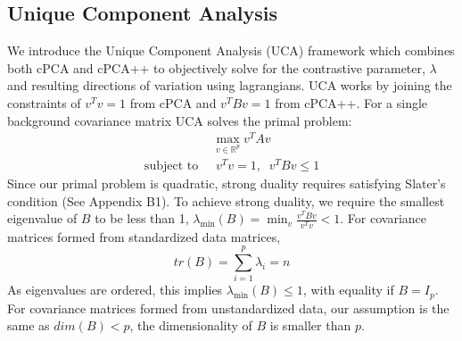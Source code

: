 \documentclass[12pt]{article}
\begin{document}
\subsection{Unique Component Analysis}
We introduce the Unique Component Analysis (UCA) framework which combines both cPCA and cPCA++ to objectively solve for the contrastive parameter, $\lambda$ and resulting directions of variation using lagrangians. UCA works by joining the constraints of $v^T v = 1$ from cPCA and $v^T Bv = 1$ from cPCA++. For a single background covariance matrix UCA solves the primal problem: 
\begin{align}
  &\max_{v\in \mathbb{R}^p}{v^TAv} \label{eq:1} \\ \text{subject to }&\; v^{T}v=1,\;\; v^TBv \leq 1 \nonumber
\end{align}
Since our primal problem is quadratic, strong duality requires satisfying Slater's condition\cite{boyd2004convex} (See Appendix B1).
To achieve strong duality, we require the smallest eigenvalue of $B$ to be less than 1, $\lambda_{\min}\left(B\right) = \min_{v}\frac{v^T B v}{v^T v}< 1$.
For covariance matrices formed from standardized data matrices, \[tr(B) = \sum_{i = 1}^{p} \lambda_i = n\]
As eigenvalues are ordered, this implies $\lambda_{\min}(B)\leq 1$, with equality if $B = I_p$.
For covariance matrices formed from unstandardized data, our assumption is the same as $dim(B) < p$, the dimensionality of $B$ is smaller than $p$. 
\end{document}

